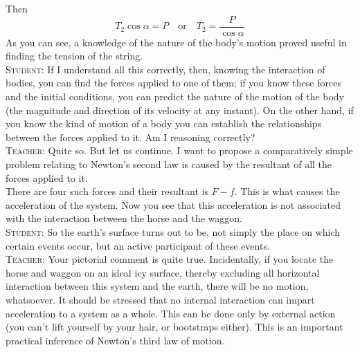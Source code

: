\documentclass[a4paper,sfsidenotes]{tufte-book}
\begin{document}
Then
$$
T_{2} \cos \alpha = P \quad \text{or} \quad T_{2} = \frac{P}{\cos \alpha}
$$
As you can see, a knowledge of the nature of the body's motion proved useful in finding the tension of the string.
\\
\textsc{Student:} If I understand all this correctly, then, knowing the interaction of bodies, you can find the forces applied to one of them; if you know these forces and the initial conditions, you can predict the nature of the motion of the body (the magnitude and direction of its velocity at any instant).
On the other hand, if you know the kind of motion of a body you can establish the relationships between the forces applied to it. Am I reasoning correctly?
\\
\textsc{Teacher:} Quite so. But let us continue. I want to propose a comparatively simple problem relating to Newton's second law is caused by the resultant of all the forces applied to it. 
\\
There are four such forces and their resultant is $F-f$. This is what causes the acceleration of the system. Now you see that this acceleration is not associated with the interaction between the horse and the waggon.
\\
\textsc{Student:} So the earth's surface turns out to be, not simply the place on which certain events occur, but an active participant of these events.
\\
\textsc{Teacher:} Your pictorial comment is quite true. Incidentally, if you locate the horse and waggon on an ideal icy surface, thereby excluding all horizontal interaction between this system and the earth, there will be no motion, whatsoever. It should be stressed that no internal interaction can impart acceleration to a system as a whole. This can be done only by external action (you can't lift yourself by your hair, or bootstraps either). This is an important practical inference of Newton's third law of motion.
\cleardoublepage
\thispagestyle{empty}
\vspace*{2cm}
\end{document}
